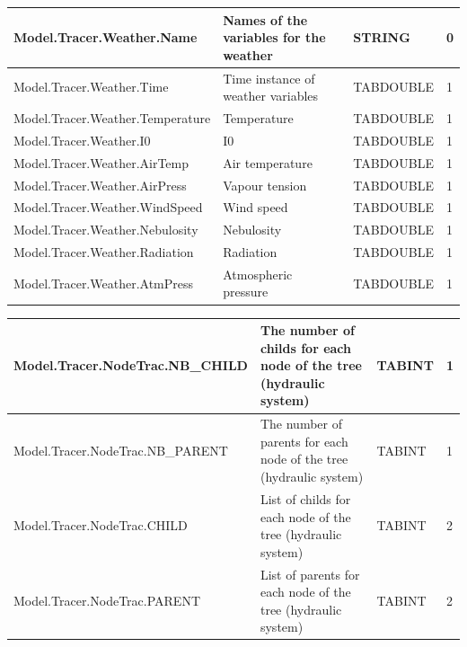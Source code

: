 \documentclass[a4paper,11pt]{article}
\begin{document}
\begin{landscape}
\begin{table}[ht]
\begin{center}
\begin{tabular}{|l|l|l|l|}

\hline Model.Tracer.Weather.Name & Names of the variables for the weather & STRING & 0 \\
\hline Model.Tracer.Weather.Time & Time instance of weather variables & TABDOUBLE & 1 \\
\hline Model.Tracer.Weather.Temperature & Temperature & TABDOUBLE & 1 \\
\hline Model.Tracer.Weather.I0 & I0 & TABDOUBLE & 1 \\
\hline Model.Tracer.Weather.AirTemp & Air temperature & TABDOUBLE & 1 \\
\hline Model.Tracer.Weather.AirPress & Vapour tension & TABDOUBLE & 1 \\
\hline Model.Tracer.Weather.WindSpeed & Wind speed & TABDOUBLE & 1 \\
\hline Model.Tracer.Weather.Nebulosity & Nebulosity & TABDOUBLE & 1 \\
\hline Model.Tracer.Weather.Radiation & Radiation & TABDOUBLE & 1 \\
\hline Model.Tracer.Weather.AtmPress & Atmospheric pressure & TABDOUBLE & 1 \\

\hline 
\end{tabular} 
\end{center}
\end{table}

\begin{table}[ht]
\begin{center}
\begin{tabular}{|l|l|l|l|}

\hline Model.Tracer.NodeTrac.NB\_CHILD & The number of childs for each node of the tree (hydraulic system) & TABINT & 1 \\
\hline Model.Tracer.NodeTrac.NB\_PARENT & The number of parents for each node of the tree (hydraulic system) & TABINT & 1 \\
\hline Model.Tracer.NodeTrac.CHILD & List of childs for each node of the tree (hydraulic system) & TABINT & 2 \\
\hline Model.Tracer.NodeTrac.PARENT & List of parents for each node of the tree (hydraulic system) & TABINT & 2 \\

\hline 
\end{tabular} 
\end{center}
\end{table}


\end{landscape}
\end{document}
